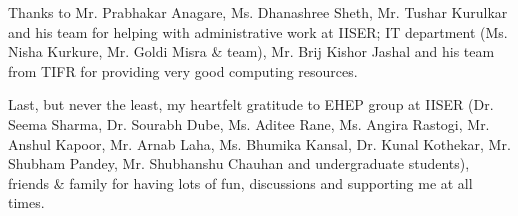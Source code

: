 \documentclass[
11pt, %
english, %
singlespacing, %
headsepline, %
]{MastersDoctoralThesis} %
\begin{document}
\begin{acknowledgements}
Thanks to Mr. Prabhakar Anagare, Ms. Dhanashree Sheth, Mr. Tushar Kurulkar and his team for helping with administrative work at IISER; IT 
department (Ms. Nisha Kurkure, Mr. Goldi Misra \& team), Mr. Brij Kishor Jashal and his team from TIFR for providing very good computing 
resources.

Last, but never the least, my heartfelt gratitude to EHEP group at IISER (Dr. Seema Sharma, Dr. Sourabh Dube, Ms. Aditee Rane,
Ms. Angira Rastogi, Mr. Anshul Kapoor, Mr. Arnab Laha, Ms. Bhumika Kansal, Dr. Kunal Kothekar, Mr. Shubham Pandey, Mr. Shubhanshu Chauhan and undergraduate students), friends
\& family for having lots of fun, discussions and supporting me at all times.
\end{acknowledgements}


\tableofcontents %

\listoffigures %

\listoftables %





\end{document}
